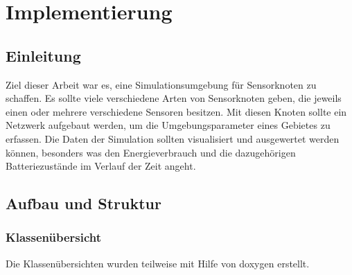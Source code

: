 \chapter{Implementierung}

\section{Einleitung}

Ziel dieser Arbeit war es, eine Simulationsumgebung für Sensorknoten zu schaffen. Es sollte viele verschiedene Arten von Sensorknoten geben, die jeweils einen oder mehrere verschiedene Sensoren besitzen. Mit diesen Knoten sollte ein Netzwerk aufgebaut werden, um die Umgebungsparameter eines Gebietes zu erfassen.
Die Daten der Simulation sollten visualisiert und ausgewertet werden können, besonders was den Energieverbrauch und die dazugehörigen Batteriezustände im Verlauf der Zeit angeht.

\section{Aufbau und Struktur}

\subsection{Klassenübersicht}

Die Klassenübersichten wurden teilweise mit Hilfe von doxygen\cite{doxygen} erstellt. 

